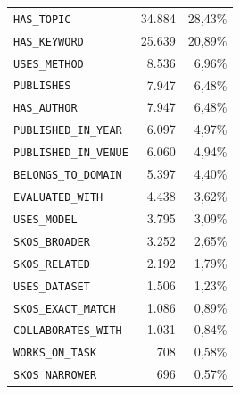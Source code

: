 \begin{enumerate}[label=(\alph*), leftmargin=*, itemsep=10pt]
\begin{longtable}{@{}lrr@{}}
              \texttt{HAS\_TOPIC}           & 34.884  & 28,43\%                                                \\
              \texttt{HAS\_KEYWORD}         & 25.639  & 20,89\%                                                \\
              \texttt{USES\_METHOD}         & 8.536   & 6,96\%                                                 \\
              \texttt{PUBLISHES}            & 7.947   & 6,48\%                                                 \\
              \texttt{HAS\_AUTHOR}          & 7.947   & 6,48\%                                                 \\
              \texttt{PUBLISHED\_IN\_YEAR}  & 6.097   & 4,97\%                                                 \\
              \texttt{PUBLISHED\_IN\_VENUE} & 6.060   & 4,94\%                                                 \\
              \texttt{BELONGS\_TO\_DOMAIN}  & 5.397   & 4,40\%                                                 \\
              \texttt{EVALUATED\_WITH}      & 4.438   & 3,62\%                                                 \\
              \texttt{USES\_MODEL}          & 3.795   & 3,09\%                                                 \\
              \texttt{SKOS\_BROADER}        & 3.252   & 2,65\%                                                 \\
              \texttt{SKOS\_RELATED}        & 2.192   & 1,79\%                                                 \\
              \texttt{USES\_DATASET}        & 1.506   & 1,23\%                                                 \\
              \texttt{SKOS\_EXACT\_MATCH}   & 1.086   & 0,89\%                                                 \\
              \texttt{COLLABORATES\_WITH}   & 1.031   & 0,84\%                                                 \\
              \texttt{WORKS\_ON\_TASK}      & 708     & 0,58\%                                                 \\
              \texttt{SKOS\_NARROWER}       & 696     & 0,57\%                                                 \\

\end{longtable}
\end{enumerate}
